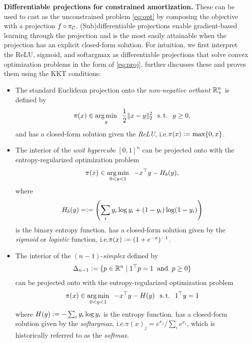 \documentclass[twoside,11pt]{article}
\newcommand{\ie}{i.e.\xspace}
\begin{document}
\textbf{Differentiable projections for constrained amortization.}
These can be used to cast  as the unconstrained
problem \cref{eq:opt} by composing the objective with a projection
$f\circ \pi_{\mathcal{C}}$.
(Sub)differentiable projections enable gradient-based learning through the projection
and is the most easily attainable when the projection has an explicit closed-form solution.
For intuition, we first interpret the ReLU, sigmoid, and softargmax as
differentiable projections that solve convex optimization problems
in the form of \cref{eq:proj}.
\citet[\S2.4.4]{amos2019differentiable} further discusses these
and proves them using the KKT conditions:
\begin{itemize}
\item The standard Euclidean projection onto the
  \emph{non-negative orthant} $\mathbb{R}^n_+$ is defined by
  \begin{equation}
    \pi(x) \in \operatorname*{arg\,min}_y \;\; \frac{1}{2}\|x-y\|_2^2 \;\; \operatorname*{s.t.} \;\; y\geq 0,
    \label{eq:relu-proj}
  \end{equation}
  and has a closed-form solution given the
  \emph{ReLU}, \ie $\pi(x) \vcentcolon= \max\{0, x\}$.
\item The interior of the \emph{unit hypercube} $[0,1]^n$ can
  be projected onto with the entropy-regularized
  optimization problem
  \begin{equation}
    \pi(x) \in \operatorname*{arg\,min}_{0<y<1} \;\; -x^\top y -H_b(y),
    \label{eq:sigmoid-proj}
  \end{equation}
  where
  \begin{equation}
  H_b(y) = \vcentcolon= \left(\sum_i y_i\log y_i + (1-y_i)\log (1-y_i)\right)
  \end{equation}
  is the
  binary entropy function.
   has a closed-form solution given by
  the \emph{sigmoid} or \emph{logistic} function,
  \ie $\pi(x) \vcentcolon= (1+e^{-x})^{-1}$.
\item The interior of the $(n-1)$-\emph{simplex} defined by
  \begin{equation}
    \Delta_{n-1}\vcentcolon=\{p\in\mathbb{R}^n\; \vert\; 1^\top p = 1 \; \; {\rm and} \;\; p \geq 0 \}
    \label{eq:simplex}
  \end{equation}
  can be projected onto with the entropy-regularized
  optimization problem
  \begin{equation}
    \pi(x) \in \operatorname*{arg\,min}_{0<y<1} \;\; -x^\top y - H(y) \;\; \operatorname*{s.t.}\;\; 1^\top y = 1
    \label{eq:simplex-proj}
  \end{equation}
  where $H(y) \vcentcolon= -\sum_i y_i \log y_i$ is the entropy function.
   has a closed-form solution given by
  the \emph{softargmax}, \ie $\pi(x)_j = e^{x_j} / \sum_i e^{x_i}$,
  which is historically referred to as the \emph{softmax}.
\end{itemize}
\end{document}
